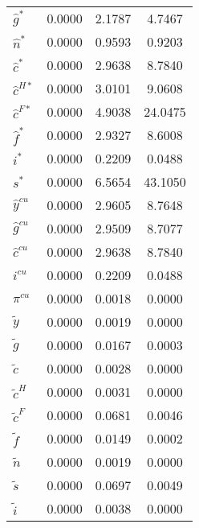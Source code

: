 \begin{center}
\begin{longtable}{lccc}
${\hat g^*}            $	 & 	       0.0000	 & 	       2.1787	 & 	       4.7467 \\ 
${\hat n^*}            $	 & 	       0.0000	 & 	       0.9593	 & 	       0.9203 \\ 
${\hat c^*}            $	 & 	       0.0000	 & 	       2.9638	 & 	       8.7840 \\ 
${\hat c^{H*}}         $	 & 	       0.0000	 & 	       3.0101	 & 	       9.0608 \\ 
${\hat c^{F*}}         $	 & 	       0.0000	 & 	       4.9038	 & 	      24.0475 \\ 
${\hat f^*}            $	 & 	       0.0000	 & 	       2.9327	 & 	       8.6008 \\ 
${i^*}                 $	 & 	       0.0000	 & 	       0.2209	 & 	       0.0488 \\ 
${s^*}                 $	 & 	       0.0000	 & 	       6.5654	 & 	      43.1050 \\ 
${\hat y^{cu}}         $	 & 	       0.0000	 & 	       2.9605	 & 	       8.7648 \\ 
${\hat g^{cu}}         $	 & 	       0.0000	 & 	       2.9509	 & 	       8.7077 \\ 
${\hat c^{cu}}         $	 & 	       0.0000	 & 	       2.9638	 & 	       8.7840 \\ 
${i^{cu}}              $	 & 	       0.0000	 & 	       0.2209	 & 	       0.0488 \\ 
${\pi^{cu}}            $	 & 	       0.0000	 & 	       0.0018	 & 	       0.0000 \\ 
${\tilde y}            $	 & 	       0.0000	 & 	       0.0019	 & 	       0.0000 \\ 
${\tilde g}            $	 & 	       0.0000	 & 	       0.0167	 & 	       0.0003 \\ 
${\tilde c}            $	 & 	       0.0000	 & 	       0.0028	 & 	       0.0000 \\ 
${\tilde c^H}          $	 & 	       0.0000	 & 	       0.0031	 & 	       0.0000 \\ 
${\tilde c^F}          $	 & 	       0.0000	 & 	       0.0681	 & 	       0.0046 \\ 
${\tilde f}            $	 & 	       0.0000	 & 	       0.0149	 & 	       0.0002 \\ 
${\tilde n}            $	 & 	       0.0000	 & 	       0.0019	 & 	       0.0000 \\ 
${\tilde s}            $	 & 	       0.0000	 & 	       0.0697	 & 	       0.0049 \\ 
${\tilde i}            $	 & 	       0.0000	 & 	       0.0038	 & 	       0.0000 \\ 

\end{longtable}
\end{center}
